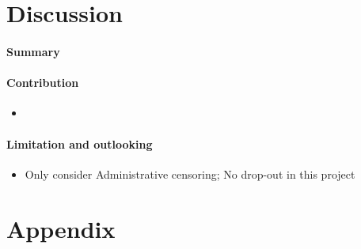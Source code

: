 \documentclass[11pt,a4paper]{article}
\begin{document}
\section{Discussion}
\paragraph{Summary}

\paragraph{Contribution}
\begin{itemize}
    \item 
\end{itemize}

\paragraph{Limitation and outlooking}
\begin{itemize}
    \item Only consider Administrative censoring; No drop-out in this project
\end{itemize}


\newpage



\newpage 

\section{Appendix}
\end{document}
